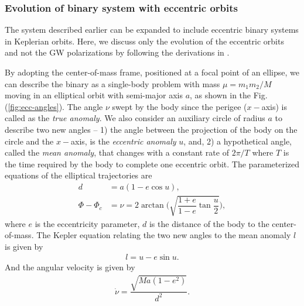 


\subsubsection{Evolution of binary system with eccentric orbits}

The system described earlier can be expanded to include eccentric binary systems in Keplerian orbits. Here, we discuss only the evolution of the eccentric orbits and not the GW polarizations by following the derivations in \cite{Peters:1963ux,Peters:1964zz}.

By adopting the center-of-mass frame, positioned at a focal point of an ellipse, we can describe the binary as a single-body problem with mass $\mu = m_1m_2/M$ moving in an elliptical orbit with semi-major axis $a$, as shown in the Fig. (\ref{fig:ecc-angles}). The angle $\nu$ swept by the body since the perigee ($x-$axis) is called as the \textit{true anomaly}. We also consider an auxiliary circle of radius $a$ to describe two new angles -- 1) the angle between the projection of the body on the circle and the $x-$axis, is the \textit{eccentric anomaly} $u$, and, 2) a hypothetical angle, called the \textit{mean anomaly}, that changes with a constant rate of $2\pi/T$ where $T$ is the time required by the body to complete one eccentric orbit. The parameterized equations of the elliptical trajectories are 
\begin{align}
    d &= a(1 - e\cos u), \\
    \Phi - \Phi_c &= \nu = 2\arctan\Bigg( \sqrt{\dfrac{1+e}{1-e}\tan\dfrac{u}{2}}\Bigg), \label{Eq:true-anomaly}
\end{align}
where $e$ is the eccentricity parameter, $d$ is the distance of the body to the center-of-mass. The Kepler equation relating the two new angles to the mean anomaly $l$ is given by
\begin{align}
    l = u - e\sin u. \label{Eq:ecc-kepler-eq}
\end{align}
And the angular velocity is given by 
\begin{align}
    \dot{\nu} = \dfrac{\sqrt{Ma(1-e^2)}}{d^2}.
\end{align}

